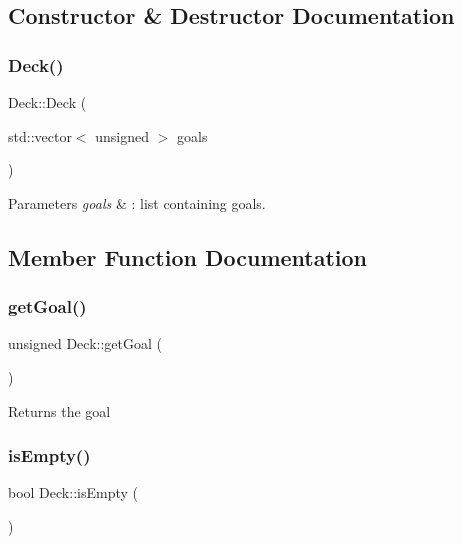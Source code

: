 \subsection{Constructor \& Destructor Documentation}
\mbox{\label{classDeck_a10459a37e09fe362ae163dc7ae645f0e}} 
\subsubsection{\texorpdfstring{Deck()}{Deck()}}
{\footnotesize\ttfamily Deck\+::\+Deck (\begin{DoxyParamCaption}\item[{std\+::vector$<$ unsigned $>$}]{goals }\end{DoxyParamCaption})}


\begin{DoxyParams}{Parameters}
{\em goals} & \+: list containing goals. \\
\hline
\end{DoxyParams}


\subsection{Member Function Documentation}
\mbox{\label{classDeck_ac8eb3ae174a4bec598b13ff53730efe2}} 
\subsubsection{\texorpdfstring{getGoal()}{getGoal()}}
{\footnotesize\ttfamily unsigned Deck\+::get\+Goal (\begin{DoxyParamCaption}{ }\end{DoxyParamCaption})}

\begin{DoxyReturn}{Returns}
the goal 
\end{DoxyReturn}
\mbox{\label{classDeck_a0233c3d2ab48074ba0bb196d958d9dff}} 
\subsubsection{\texorpdfstring{isEmpty()}{isEmpty()}}
{\footnotesize\ttfamily bool Deck\+::is\+Empty (\begin{DoxyParamCaption}{ }\end{DoxyParamCaption})}

